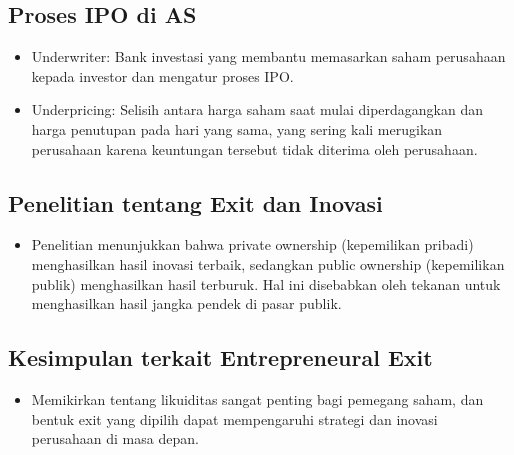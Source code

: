 \documentclass{article}
\begin{document}
\subsection{Proses IPO di AS}
\begin{itemize}
    \item Underwriter: Bank investasi yang membantu memasarkan saham perusahaan kepada investor dan mengatur proses IPO.
    \item Underpricing: Selisih antara harga saham saat mulai diperdagangkan dan harga penutupan pada hari yang sama, yang sering kali merugikan perusahaan karena keuntungan tersebut tidak diterima oleh perusahaan.
\end{itemize}

\subsection{Penelitian tentang Exit dan Inovasi}
\begin{itemize}
    \item Penelitian menunjukkan bahwa private ownership (kepemilikan pribadi) menghasilkan hasil inovasi terbaik, sedangkan public ownership (kepemilikan publik) menghasilkan hasil terburuk. Hal ini disebabkan oleh tekanan untuk menghasilkan hasil jangka pendek di pasar publik.
\end{itemize}

\subsection{Kesimpulan terkait Entrepreneural Exit}
\begin{itemize}
    \item Memikirkan tentang likuiditas sangat penting bagi pemegang saham, dan bentuk exit yang dipilih dapat mempengaruhi strategi dan inovasi perusahaan di masa depan.
\end{itemize}
\end{document}
